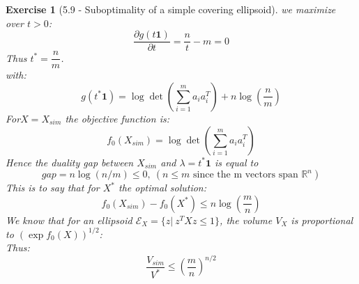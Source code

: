 \documentclass[11pt]{article}
\theoremstyle{exo}
\newtheorem*{exercise}{Exercise}
\newcommand{\R}{\mathbb{R}}
\newcommand{\1}{\mathbf{1}}
\newcommand{\0}{\mathbf{0}}
\begin{document}
\begin{exercise}[5.9 - Suboptimality of a simple covering ellipsoid]
we maximize over $t>0$:
\[\frac{\partial g(t\1)}{\partial t}=\frac{n}{t}-m=0\]
Thus $t^*=\dfrac{n}{m}$.\\
with:
\[g(t^*\1)=\log\det(\sum\limits_{i=1}^ma_ia_i^T)+n\log(\dfrac{n}{m})\]
For$ X=X_{sim}$ the objective function is:
\[f_0(X_{sim})=\log\det(\sum\limits_{i=1}^ma_ia_i^T)\]
Hence the duality gap between $X_{sim}$ and $\lambda=t^*\1$ is equal to 
\[gap=n\log(n/m)\leq 0,\:(n\leq m\text{ since the m vectors span }\R^n)\]
This is to say that for $X^*$ the optimal solution:
\[f_0(X_{sim})-f_0(X^*)\leq n\log(\dfrac{m}{n}) \]
We know that for an ellipsoid $\mathcal E_X=\{z|\:z^TXz\leq 1\}$, the volume $V_X$ is proportional to $(\exp f_0(X))^{1/2}$:\\
Thus:
\[\dfrac{V_{sim}}{V^*}\leq\left(\dfrac{m}{n}\right)^{n/2}\]
\end{exercise}
\end{document}
